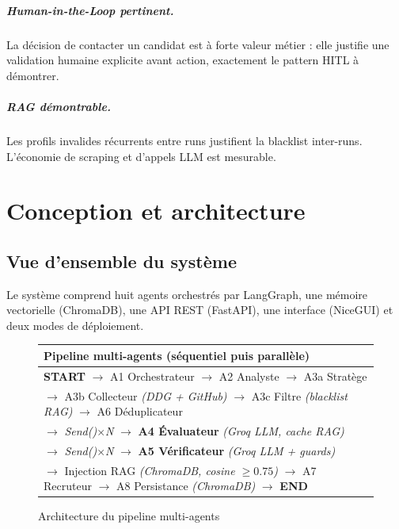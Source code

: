 \documentclass[12pt,a4paper]{report}
\begin{document}
\paragraph{Human-in-the-Loop pertinent.}
La décision de contacter un candidat est à forte valeur métier : elle justifie une
validation humaine explicite avant action, exactement le pattern HITL à démontrer.

\paragraph{RAG démontrable.}
Les profils invalides récurrents entre runs justifient la blacklist inter-runs.
L'économie de scraping et d'appels LLM est mesurable.

\chapter{Conception et architecture}
\label{chap:conception}

\section{Vue d'ensemble du système}

Le système comprend huit agents orchestrés par LangGraph, une mémoire vectorielle
(ChromaDB), une API REST (FastAPI), une interface (NiceGUI) et deux modes de
déploiement.

\begin{figure}[H]
\centering
\begin{tabularx}{\textwidth}{X}
\toprule
\textbf{Pipeline multi-agents (séquentiel puis parallèle)} \\
\midrule
\textbf{START} $\to$ A1 Orchestrateur $\to$ A2 Analyste $\to$ A3a Stratège \\
$\to$ A3b Collecteur \textit{(DDG + GitHub)} $\to$ A3c Filtre \textit{(blacklist RAG)} $\to$ A6 Déduplicateur \\
$\to$ \textit{Send()$\times$N} $\to$ \textbf{A4 Évaluateur} \textit{(Groq LLM, cache RAG)} \\
$\to$ \textit{Send()$\times$N} $\to$ \textbf{A5 Vérificateur} \textit{(Groq LLM + guards)} \\
$\to$ Injection RAG \textit{(ChromaDB, cosine $\geq 0.75$)} $\to$ A7 Recruteur $\to$ A8 Persistance \textit{(ChromaDB)} $\to$ \textbf{END} \\
\bottomrule
\end{tabularx}
\caption{Architecture du pipeline multi-agents}
\label{fig:pipeline}
\end{figure}
\end{document}
